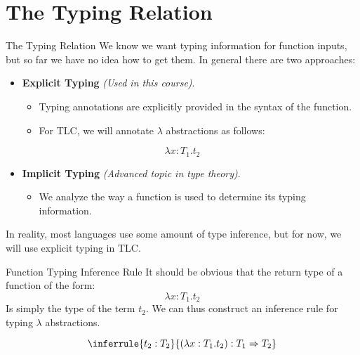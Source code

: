 \documentclass[11pt]{beamer}
\begin{document}
\section[Relation]{The Typing Relation}
\begin{frame}[fragile=singleslide]{The Typing Relation}
We know we want typing information for function inputs, but so far we have no idea how to get them.  In general there are two approaches:
\begin{itemize}
\item \textbf{Explicit Typing} \emph{(Used in this course)}.
\begin{itemize}
\item Typing annotations are explicitly provided in the syntax of the function.  
\item For TLC, we will annotate $\lambda$ abstractions as follows:
\end{itemize}
\end{itemize}
\begin{equation}
\lambda x:T_1 . t_2
\end{equation}
\begin{itemize}
\item \textbf{Implicit Typing} \emph{(Advanced topic in type theory)}.
\begin{itemize}
\item We analyze the way a function is used to determine its typing information. 
\end{itemize}
\end{itemize}
In reality, most languages use some amount of type inference, but for now, we will use explicit typing in TLC.  
\end{frame}

\begin{frame}[fragile=singleslide]{Function Typing Inference Rule}
It should be obvious that the return type of a function of the form:
\begin{equation}
\lambda x:T_1 . t_2
\end{equation}
Is simply the type of the term $t_2$.  We can thus construct an inference rule for typing $\lambda$ abstractions.

\begin{equation}
\inferrule{t_2 : T_2}{(\lambda x : T_1 . t_2) : T_1 \Rightarrow T_2}
\end{equation}

\end{frame}
\end{document}
